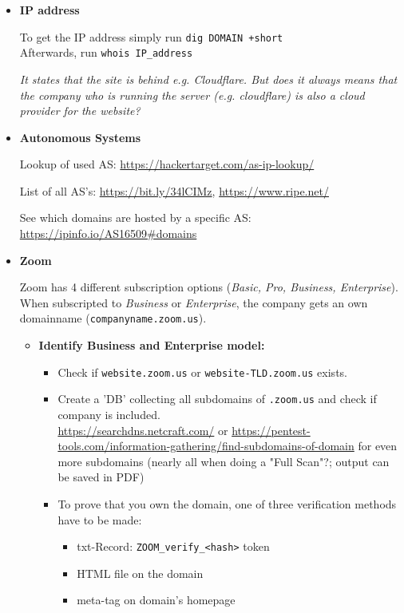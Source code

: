 \documentclass[12pt]{article}
\begin{document}
\begin{itemize}
    
    \item \textbf{IP address}
    
    To get the IP address simply run \verb|dig DOMAIN +short| \\
    Afterwards, run \verb|whois IP_address| 
    
    \textit{It states that the site is behind e.g. Cloudflare. But does it always means that the company who is running the server (e.g. cloudflare) is also a cloud provider for the website?}
    
    
    \item \textbf{Autonomous Systems}
    
    Lookup of used AS: \url{https://hackertarget.com/as-ip-lookup/}
    
    List of all AS's: \url{https://bit.ly/34lCIMz}, \url{https://www.ripe.net/}
    
    See which domains are hosted by a specific AS: \url{https://ipinfo.io/AS16509#domains}
    
    
    \item \textbf{Zoom}
    
    Zoom has 4 different subscription options (\textit{Basic, Pro, Business, Enterprise}). When subscripted to \textit{Business} or \textit{Enterprise}, the company gets an own domainname (\verb|companyname.zoom.us|).
    
    \begin{itemize}
        \item \textbf{Identify Business and Enterprise model:} 
        \begin{itemize}
            \item Check if \verb|website.zoom.us| or \verb|website-TLD.zoom.us| exists.
            \item Create a 'DB' collecting all subdomains of \verb|.zoom.us| and check if company is included.\\
            \url{https://searchdns.netcraft.com/} or \url{https://pentest-tools.com/information-gathering/find-subdomains-of-domain} for even more subdomains (nearly all when doing a "Full Scan"?; output can be saved in PDF)
            \item To prove that you own the domain, one of three verification methods have to be made:
            \begin{itemize}
                \item txt-Record: \verb|ZOOM_verify_<hash>| token
                \item HTML file on the domain
                \item meta-tag on domain's homepage
            \end{itemize}
        \end{itemize}
    \end{itemize}
    

\end{itemize}
\end{document}
